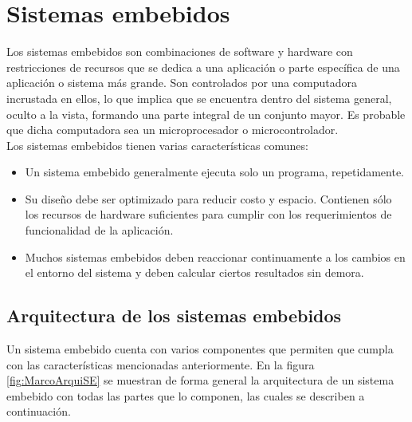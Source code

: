 \section{Sistemas embebidos}
	Los sistemas embebidos son combinaciones de software y hardware con restricciones de recursos que se dedica a una aplicación o parte específica de una aplicación o sistema más grande. Son controlados por una computadora incrustada en ellos, lo que implica que se encuentra dentro del sistema general, oculto a la vista, formando una parte integral de un conjunto mayor. Es probable que dicha computadora sea un microprocesador o microcontrolador. \cite{vahid1999} \cite{kamal2008} \\
	
	Los sistemas embebidos tienen varias características comunes:
	\begin{itemize}
		\item Un sistema embebido generalmente ejecuta solo un programa, repetidamente.
		\item Su diseño debe ser optimizado para reducir costo y espacio. Contienen sólo los recursos de hardware suficientes para cumplir con  los  requerimientos  de  funcionalidad  de  la  aplicación.
		\item Muchos sistemas embebidos deben reaccionar continuamente a los cambios en el entorno del sistema y deben calcular ciertos resultados sin demora.
	\end{itemize}
	
	
	\subsection{Arquitectura de los sistemas embebidos}
	Un sistema embebido cuenta con varios componentes que permiten que cumpla con las características mencionadas anteriormente. En la figura \ref{fig:MarcoArquiSE} se muestran de forma general la arquitectura de un sistema embebido con todas las partes que lo componen, las cuales se describen a continuación. \cite{nadalEmbebidos} \cite{heath2005}
	

